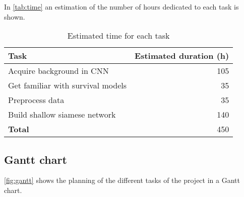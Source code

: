 In \autoref{tab:time} an estimation of the number of hours dedicated to each task is shown.

\begin{table}
  \centering{}
  \begin{tabular}{|l|r|}
    \hline
    Task & Estimated duration (h) \\ \hline \hline
    Acquire background in CNN & 105 \\ \hline
    Get familiar with survival models & 35 \\ \hline
    Preprocess data & 35 \\ \hline
    Build shallow siamese network & 140 \\
  
    \hline \hline
    \textbf{Total} & 450 \\
    \hline
  \end{tabular}
  \caption{Estimated time for each task \label{tab:time}}
\end{table}

\subsection{Gantt chart}

\autoref{fig:gantt} shows the planning of the different tasks of the project in a Gantt chart.

